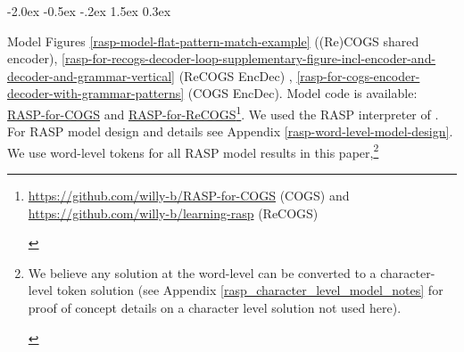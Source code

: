 \documentclass[11pt]{article}
\makeatletter
\renewcommand\section{\@startsection{section}{1}{\z@}%
                                  {-2.0ex \@plus -0.5ex \@minus -.2ex}%
                                  {1.5ex \@plus 0.3ex}%
                                  {\large\bfseries\raggedright}}
\makeatother
\begin{document}
\section{Model}
\label{model}
Figures \ref{rasp-model-flat-pattern-match-example} ((Re)COGS shared encoder), \ref{rasp-for-recogs-decoder-loop-supplementary-figure-incl-encoder-and-decoder-and-grammar-vertical} (ReCOGS EncDec) , \ref{rasp-for-cogs-encoder-decoder-with-grammar-patterns} (COGS EncDec).
Model code is available: \href{https://github.com/willy-b/RASP-for-COGS}{RASP-for-COGS} and \href{https://github.com/willy-b/learning-rasp}{RASP-for-ReCOGS}\footnote{\begin{footnotesize}\href{https://github.com/willy-b/RASP-for-COGS}{https://github.com/willy-b/RASP-for-COGS} (COGS) and \href{https://github.com/willy-b/learning-rasp}{https://github.com/willy-b/learning-rasp} (ReCOGS)\end{footnotesize}}. We used the RASP interpreter of \citep{Weiss2021}. For RASP model design and details see Appendix \ref{rasp-word-level-model-design}. We use word-level tokens for all RASP model results in this paper,\footnote{\begin{footnotesize}We believe any solution at the word-level can be converted to a character-level token solution (see Appendix \ref{rasp_character_level_model_notes} for proof of concept details on a character level solution not used here).
\end{footnotesize}
}
\end{document}
